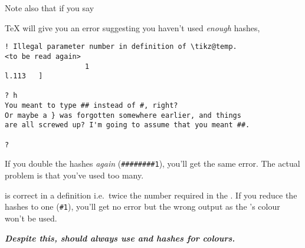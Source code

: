 \documentclass[10pt,british,a4paper]{ltxdoc}
\newcommand*{\cywir}{\marginpar{\raggedleft\mbox{ }\bigskip\par\textcolor{green}{\ding{52}}}}
\newcommand*{\anghywir}{\marginpar{\raggedleft\mbox{ }\bigskip\par\textcolor{red}{\ding{56}~}}}
\newcommand*\pkg[1]{\textpkg{#1}}
\begin{document}
Note also that if you say
\anghywir{}
\TeX{} will give you an error suggesting you haven't used \emph{enough} hashes, 
\begin{verbatim}
! Illegal parameter number in definition of \tikz@temp.
<to be read again> 
                   1
l.113   ]
         
? h
You meant to type ## instead of #, right?
Or maybe a } was forgotten somewhere earlier, and things
are all screwed up? I'm going to assume that you meant ##.

? 
\end{verbatim}
If you double the hashes \emph{again} (\texttt{\#\#\#\#\#\#\#\#1}), you'll get the same error.
The actual problem is that you've used too many.
\cywir{}
is correct in a \chronosstylelabelname{} definition i.e.~twice the number required in the .
If you reduce the hashes to one (\texttt{\#1}), you'll get no error but the wrong output as the \elementlabelname{}'s colour won't be used.

\textbf{\emph{Despite this, \chronosstyleslabelname{} should always use \pkg{chronos} \keyslabelname{} and hashes for colours.}}
\end{document}
